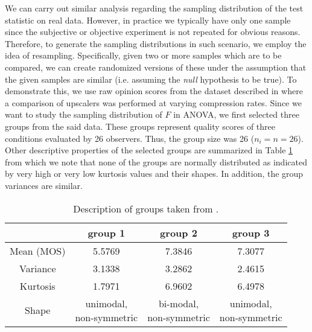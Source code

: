 \documentclass[10pt,final,Twcolumn]{IEEEtran}
\begin{document}
We can carry out similar analysis regarding the sampling distribution of the test statistic on real data. However, in practice we typically have only one sample since the subjective or objective experiment is not repeated for obvious reasons. Therefore, to generate the sampling distributions in such scenario, we employ the idea of resampling. Specifically, given two or more samples which are to be compared, we can create randomized versions of these under the assumption that the given samples are similar (i.e. assuming the {\it{null}} hypothesis to be true).  To demonstrate this, we use raw opinion scores from the dataset described in \cite{Pitrey} where a comparison of upscalers was performed at varying compression rates. Since we want to study the sampling distribution of $F$ in ANOVA, we first selected three groups from the said data. These groups represent quality scores of three conditions evaluated by 26 observers. Thus, the group size was 26 ($n_i = n = 26$). Other descriptive properties of the selected groups are summarized in Table \ref{table2} from which we note that none of the groups are normally distributed as indicated by very high or very low kurtosis values and their shapes. In addition, the group variances are similar.  

\begin{table} 
\caption{Description of groups taken from \cite{Pitrey}.}
\label{table2}

\begin{tabular}{|c||c| |c| |c| }
\hline
{}  & group 1 & group 2 & group 3\\
\hline
Mean (MOS) & 5.5769& 7.3846 & 7.3077  \\
\hline
Variance & 3.1338 & 3.2862 & 2.4615\\
\hline
Kurtosis & 1.7971 & 6.9602   & 6.4978 \\
\hline
Shape &\shortstack{unimodal, \\non-symmetric} & \shortstack{bi-modal, \\non-symmetric} & \shortstack{unimodal, \\non-symmetric} \\
\hline
\end{tabular}
\end{table}
\end{document}

